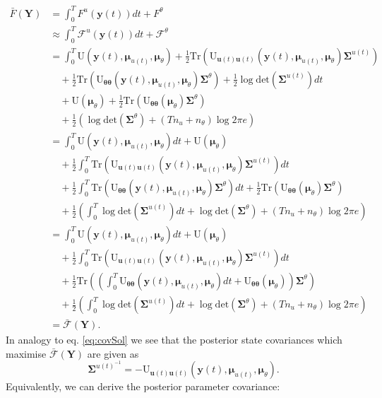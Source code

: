 \documentclass[a4paper,10pt]{article}
\newcommand{\bs}[1]{\mathbf{#1}}					%
\newcommand{\bgs}[1]{\boldsymbol{#1}}				%
\newcommand{\eq}[1]{\begin{equation} #1 \end{equation}}%
\newcommand{\trace}[1]{\mathrm{Tr}\left(#1\right)}					%
\renewcommand{\ss}{u}         %
\newcommand{\so}{y}         %
\renewcommand{\sp}{\theta}    %
\newcommand{\ps}{\bs{\ss}}    %
\newcommand{\po}{\bs{\so}}    %
\newcommand{\pp}{\bgs{\sp}} %
\newcommand{\Po}{\bs{Y}}    %
\newcommand{\U}{\mathrm{U}}			%
\newcommand{\F}{\mathcal{F}}				%
\newcommand{\Fa}{\bar{\mathcal{F}}}		%
\newcommand{\Cov}{\bgs{\Sigma}}			%
\renewcommand{\det}[1]{\mathrm{det}(#1)}	%
\begin{document}
\begin{align}
    \bar{F}(\Po) &= \int_0^T F^\ss(\po(t)) dt + F^\sp\\
    &\approx \int_0^T \F^\ss(\po(t)) dt + \F^\sp\\
    &= \int_0^T  \U(\po(t),\bgs{\mu}_{\ss(t)},\bgs{\mu}_\sp) + \frac{1}{2}\trace{\U_{\ps(t)\ps(t)}(\po(t),\bgs{\mu}_{\ss(t)},\bgs{\mu}_\sp)\Cov^{\ss(t)}}\nonumber\\
    &\quad + \frac{1}{2}\trace{\U_{\pp\pp}(\po(t),\bgs{\mu}_{\ss(t)},\bgs{\mu}_\sp)\Cov^\sp} + \frac{1}{2}\log \det{\Cov^{\ss(t)}} dt \nonumber\\ 
    &\quad + \U(\bgs{\mu}_\sp) + \frac{1}{2}\trace{\U_{\pp\pp}(\bgs{\mu}_\sp)\Cov^\sp}\nonumber\\
    &\quad + \frac{1}{2} \left(\log \det{\Cov^\sp} + (Tn_\ss + n_{\sp}) \log 2\pi e\right)\\
    &= \int_0^T  \U(\po(t),\bgs{\mu}_{\ss(t)},\bgs{\mu}_\sp)dt + \U(\bgs{\mu}_\sp) \nonumber\\
    &\quad + \frac{1}{2}\int_0^T \trace{\U_{\ps(t)\ps(t)}(\po(t),\bgs{\mu}_{\ss(t)},\bgs{\mu}_\sp)\Cov^{\ss(t)}}dt\nonumber\\
    &\quad + \frac{1}{2}\int_0^T \trace{\U_{\pp\pp}(\po(t),\bgs{\mu}_{\ss(t)},\bgs{\mu}_\sp)\Cov^\sp} dt + \frac{1}{2}\trace{\U_{\pp\pp}(\bgs{\mu}_\sp)\Cov^\sp}\nonumber\\
    &\quad + \frac{1}{2} \left(\int_0^T \log \det{\Cov^{\ss(t)}} dt + \log \det{\Cov^\sp} + (Tn_\ss + n_{\sp}) \log 2\pi e\right)\\
    &= \label{eq:approxFreeActionFull} \int_0^T  \U(\po(t),\bgs{\mu}_{\ss(t)},\bgs{\mu}_\sp)dt + \U(\bgs{\mu}_\sp) \nonumber\\
    &\quad + \frac{1}{2}\int_0^T \trace{\U_{\ps(t)\ps(t)}(\po(t),\bgs{\mu}_{\ss(t)},\bgs{\mu}_\sp)\Cov^{\ss(t)}}dt\nonumber\\
    &\quad + \frac{1}{2} \trace{\left(\int_0^T \U_{\pp\pp}(\po(t),\bgs{\mu}_{\ss(t)},\bgs{\mu}_\sp)dt + \U_{\pp\pp}(\bgs{\mu}_\sp)\right)\Cov^\sp}\nonumber\\
    &\quad + \frac{1}{2} \left(\int_0^T \log \det{\Cov^{\ss(t)}} dt + \log \det{\Cov^\sp} + (Tn_\ss + n_{\sp}) \log 2\pi e\right)\\
    &= \Fa(\Po).
\end{align}
In analogy to eq. \eqref{eq:covSol} we see that the posterior state covariances which maximise $\Fa(\Po)$ are given as
\eq{\label{eq:postCovStates}
    \Cov^{\ss(t)^{-1}} = -\U_{\ps(t)\ps(t)}(\po(t),\bgs{\mu}_{\ss(t)},\bgs{\mu}_\sp).
}
Equivalently, we can derive the posterior parameter covariance:
\end{document}

